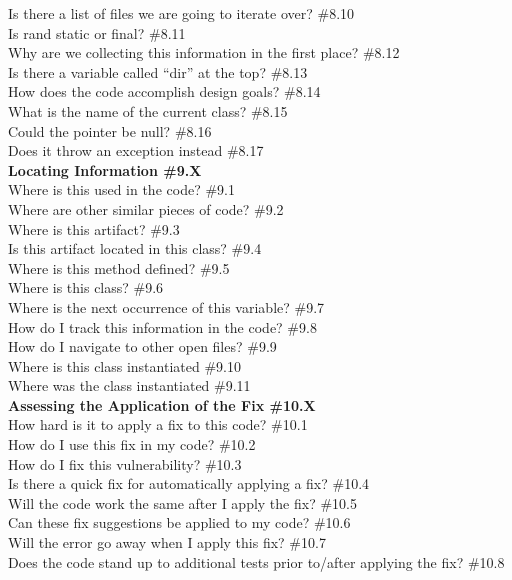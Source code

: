 \documentclass[10pt,journal,compsoc]{IEEEtran}
\begin{document}
	Is there a list of files we are going to iterate over?  \#8.10 \\
	Is rand static or final?  \#8.11 \\
	Why are we collecting this information in the first place?  \#8.12 \\
	Is there a variable called ``dir'' at the top?  \#8.13 \\
	How does the code accomplish design goals?  \#8.14 \\
	What is the name of the current class?  \#8.15 \\
	Could the pointer be null?  \#8.16 \\
	Does it throw an exception instead  \#8.17 \\
\textbf{Locating Information \#9.X} \\
	Where is this used in the code? \#9.1 \\
	Where are other similar pieces of code? \#9.2 \\
	Where is this artifact?  \#9.3 \\
	Is this artifact located in this class? \#9.4 \\
	Where is this method defined?  \#9.5 \\
	Where is this class?  \#9.6 \\
	Where is the next occurrence of this variable?  \#9.7 \\
	How do I track this information in the code? \#9.8 \\
	How do I navigate to other open files? \#9.9 \\
	Where is this class instantiated  \#9.10 \\
	Where was the class instantiated  \#9.11 \\
\textbf{Assessing the Application of the Fix \#10.X} \\
	How hard is it to apply a fix to this code? \#10.1 \\
	How do I use this fix in my code? \#10.2 \\
	How do I fix this vulnerability? \#10.3 \\
	Is there a quick fix for automatically applying a fix? \#10.4 \\
	Will the code work the same after I apply the fix? \#10.5 \\
	Can these fix suggestions be applied to my code? \#10.6 \\
	Will the error go away when I apply this fix? \#10.7 \\
	Does the code stand up to additional tests prior to/after applying the fix?  \#10.8 \\
\end{document}
